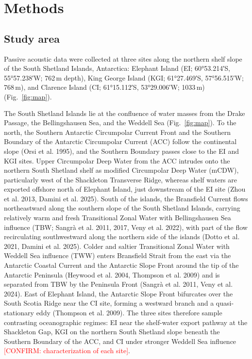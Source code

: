 \documentclass[11pt]{article}
\newcommand{\conf}[1]{\textcolor{red}{[CONFIRM: #1]}}
\newcommand{\unit}[1]{\,#1}
\begin{document}
\section{Methods}

\subsection{Study area}
Passive acoustic data were collected at three sites along the northern shelf slope of the South Shetland Islands, Antarctica: Elephant Island (EI; 60°53.214′S, 55°57.238′W; 762\unit{m} depth), King George Island (KGI; 61°27.469′S, 57°56.515′W; 768\unit{m}), and Clarence Island (CI; 61°15.112′S, 53°29.006′W; 1033\unit{m}) (Fig.~\ref{fig:map}).

The South Shetland Islands lie at the confluence of water masses from the Drake Passage, the Bellingshausen Sea, and the Weddell Sea (Fig.~\ref{fig:map}). To the north, the Southern Antarctic Circumpolar Current Front and the Southern Boundary of the Antarctic Circumpolar Current (ACC) follow the continental slope (Orsi et al. 1995), and the Southern Boundary passes close to the EI and KGI sites. Upper Circumpolar Deep Water from the ACC intrudes onto the northern South Shetland shelf as modified Circumpolar Deep Water (mCDW), particularly west of the Shackleton Transverse Ridge, whereas shelf waters are exported offshore north of Elephant Island, just downstream of the EI site (Zhou et al. 2013, Damini et al. 2025). South of the islands, the Bransfield Current flows northeastward along the southern slope of the South Shetland Islands, carrying relatively warm and fresh Transitional Zonal Water with Bellingshausen Sea influence (TBW; Sangrà et al. 2011, 2017, Veny et al. 2022), with part of the flow recirculating southwestward along the northern side of the islands (Dotto et al. 2021, Damini et al. 2025). Colder and saltier Transitional Zonal Water with Weddell Sea influence (TWW) enters Bransfield Strait from the east via the Antarctic Coastal Current and the Antarctic Slope Front around the tip of the Antarctic Peninsula (Heywood et al. 2004, Thompson et al. 2009) and is separated from TBW by the Peninsula Front (Sangrà et al. 2011, Veny et al. 2024). East of Elephant Island, the Antarctic Slope Front bifurcates over the South Scotia Ridge near the CI site, forming a westward branch and a quasi-stationary eddy (Thompson et al. 2009). The three sites therefore sample contrasting oceanographic regimes: EI near the shelf-water export pathway at the Shackleton Gap, KGI on the northern South Shetland slope beneath the Southern Boundary of the ACC, and CI under stronger Weddell Sea influence \conf{characterization of each site}.
\end{document}
